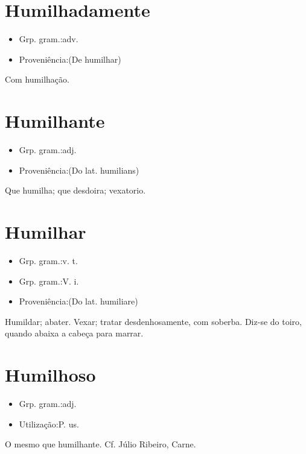 \documentclass{article}
\begin{document}
\section{Humilhadamente}
\begin{itemize}
\item {Grp. gram.:adv.}
\end{itemize}
\begin{itemize}
\item {Proveniência:(De \textunderscore humilhar\textunderscore )}
\end{itemize}
Com humilhação.
\section{Humilhante}
\begin{itemize}
\item {Grp. gram.:adj.}
\end{itemize}
\begin{itemize}
\item {Proveniência:(Do lat. \textunderscore humilians\textunderscore )}
\end{itemize}
Que humilha; que desdoira; vexatorio.
\section{Humilhar}
\begin{itemize}
\item {Grp. gram.:v. t.}
\end{itemize}
\begin{itemize}
\item {Grp. gram.:V. i.}
\end{itemize}
\begin{itemize}
\item {Proveniência:(Do lat. \textunderscore humiliare\textunderscore )}
\end{itemize}
Humildar; abater.
Vexar; tratar desdenhosamente, com soberba.
Diz-se do toiro, quando abaixa a cabeça para marrar.
\section{Humilhoso}
\begin{itemize}
\item {Grp. gram.:adj.}
\end{itemize}
\begin{itemize}
\item {Utilização:P. us.}
\end{itemize}
O mesmo que \textunderscore humilhante\textunderscore . Cf. Júlio Ribeiro, \textunderscore Carne\textunderscore .
\end{document}
